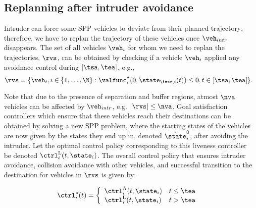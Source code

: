 \subsection{Replanning after intruder avoidance} \label{sec:replan}
Intruder can force some SPP vehicles to deviate from their planned trajectory; therefore, we have to replan the trajectory of these vehicles once $\veh_{intr}$ disappears. The set of all vehicles $\veh_i$ for whom we need to replan the trajectories, $\rvs$, can be obtained by checking if a vehicle $\veh_i$ applied any avoidnace control during $[\tsa, \tea]$, e.g.,
\begin{equation} \label{eq:RVS}
\rvs = \{\veh_i, i \in \{1, \ldots, \N \}: \valfunc^{\text{S}}_{i}(0, \state_{\intr, i}(t)) \leq 0, t \in [\tsa, \tea] \}. 
\end{equation}  

Note that due to the presence of separation and buffer regions, atmost $\nva$ vehicles can be affected by $\veh_{intr}$, e.g. $|\rvs| \leq \nva$. Goal satisfaction controllers which ensure that these vehicles reach their destinations can be obtained by solving a new SPP problem, where the starting states of the vehicles are now given by the states they end up in, denoted $\tilde{\state}_i^0$, after avoiding the intruder. Let the optimal control policy corresponding to this liveness controller be denoted ${\ctrl^{\text{L}}_{i}}(t, \state_i)$. The overall control policy that ensures intruder avoidance, collision avoidance with other vehicles, and successful transition to the destination for vehicles in $\rvs$ is given by:

\begin{equation*}
\ctrl_i^*(t) = 
\left \{ 
\begin{array}{ll}
{\ctrl^{\text{A}}_{i}}(t, \state_i) & t \leq \tea\\
{\ctrl^{\text{L}}_{i}}(t, \state_i) & t > \tea
\end{array}
\right.
\end{equation*}

